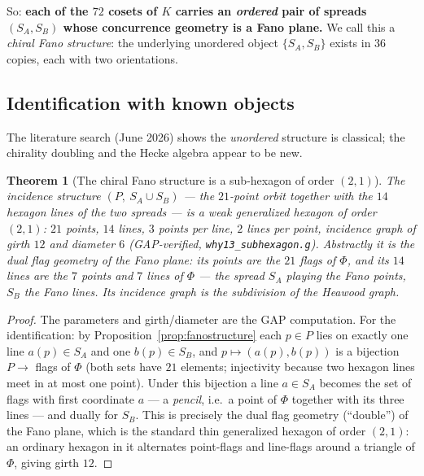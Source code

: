 \documentclass[11pt]{article}
\newtheorem{theorem}{Theorem}[section]
\theoremstyle{definition}
\begin{document}
So: \textbf{each of the $72$ cosets of $K$ carries an \emph{ordered} pair of
spreads $(S_A, S_B)$ whose concurrence geometry is a Fano plane.} We call
this a \emph{chiral Fano structure}: the underlying unordered object
$\{S_A,S_B\}$ exists in $36$ copies, each with two orientations.

\subsection{Identification with known objects}

The literature search (June 2026) shows the \emph{unordered} structure is
classical; the chirality doubling and the Hecke algebra appear to be new.

\begin{theorem}[The chiral Fano structure is a sub-hexagon of order $(2,1)$]
\label{thm:subhexagon}
The incidence structure $(P,\ S_A \cup S_B)$ --- the $21$-point orbit
together with the $14$ hexagon lines of the two spreads --- is a weak
generalized hexagon of order $(2,1)$: $21$ points, $14$ lines, $3$ points
per line, $2$ lines per point, incidence graph of girth $12$ and diameter
$6$ (GAP-verified, \texttt{why13\_subhexagon.g}). Abstractly it is the
\emph{dual flag geometry} of the Fano plane: its points are the $21$ flags
of $\Phi$, and its $14$ lines are the $7$ points and $7$ lines of $\Phi$
--- the spread $S_A$ playing the Fano points, $S_B$ the Fano lines. Its
incidence graph is the subdivision of the Heawood graph.
\end{theorem}

\begin{proof}
The parameters and girth/diameter are the GAP computation. For the
identification: by Proposition~\ref{prop:fanostructure} each $p \in P$ lies
on exactly one line $a(p) \in S_A$ and one $b(p)\in S_B$, and
$p \mapsto (a(p), b(p))$ is a bijection $P \to$ flags of $\Phi$ (both sets
have $21$ elements; injectivity because two hexagon lines meet in at most
one point). Under this bijection a line $a \in S_A$ becomes the set of
flags with first coordinate $a$ --- a \emph{pencil}, i.e.\ a point of
$\Phi$ together with its three lines --- and dually for $S_B$. This is
precisely the dual flag geometry (``double'') of the Fano plane, which is
the standard thin generalized hexagon of order $(2,1)$: an ordinary
hexagon in it alternates point-flags and line-flags around a triangle of
$\Phi$, giving girth $12$.
\end{proof}
\end{document}
